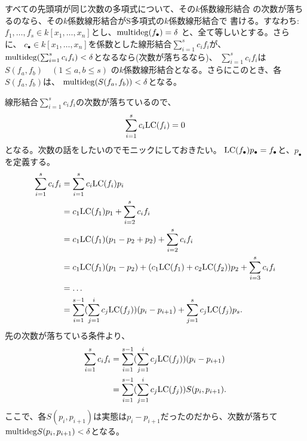 \documentclass[9pt]{ltjsarticle}
\begin{document}
すべての先頭項が同じ次数の多項式について、その$k$係数線形結合
の次数が落ちるのなら、その$k$係数線形結合がS多項式の$k$係数線形結合で
書ける。すなわち:
$f_1,\dots,f_s \in k[x_1,\dots,x_n]$とし、$\mathrm{multideg}(f_\bullet ) = \delta$
と、全て等しいとする。さらに、
$c_\bullet \in k[x_1,\dots,x_n]$を係数とした線形結合$\sum_{i=1}^s c_i f_i$が、
$\mathrm{multideg}(\sum_{i=1}^s c_i f_i) < \delta$となるなら(次数が落ちるなら)、
$\sum_{i=1}^s c_i f_i$は$S(f_a,f_b)\quad (1 \le a,b \le s)$
の$k$係数線形結合となる。さらにこのとき、各$S(f_a,f_b)$は、
$\mathrm{multideg}(S(f_a,f_b))<\delta$となる。
\begin{myproof}
  線形結合$\sum_{i=1}^s c_i f_i$の次数が落ちているので、
  \begin{align}
    \sum_{i=1}^s c_i {\rm LC}(f_i) = 0
  \end{align}
  となる。次数の話をしたいのでモニックにしておきたい。
  ${\rm LC}(f_\bullet)p_\bullet = f_\bullet$と、$p_\bullet$を定義する。
  \begin{align}
    \sum_{i=1}^s c_i f_i
    &=
    \sum_{i=1}^s c_i {\rm LC}(f_i)p_i\\
    &=
    c_1 {\rm LC}(f_1) p_1 + \sum_{i=2}^s c_i f_i \\
    &=
    c_1 {\rm LC}(f_1) (p_1 - p_2 + p_2) + \sum_{i=2}^s c_i f_i \\
    &=
    c_1 {\rm LC}(f_1) (p_1 - p_2)
    + (c_1 {\rm LC}(f_1) + c_2 {\rm LC}(f_2))p_2
    + \sum_{i=3}^s c_i f_i\\
    &=\dots\\
    &=
    \sum_{i=1}^{s-1} (\sum_{j=1}^i c_j {\rm LC}(f_j))(p_i - p_{i+1})
    + \sum_{j=1}^s c_j {\rm LC}(f_j)p_s.
  \end{align}
  先の次数が落ちている条件より、
  \begin{align}
    \sum_{i=1}^s c_i f_i
    &=
    \sum_{i=1}^{s-1}(\sum_{j=1}^i c_j {\rm LC}(f_j))(p_i - p_{i+1})\\
    &=
    \sum_{i=1}^{s-1}(\sum_{j=1}^i c_j {\rm LC}(f_j))S(p_i,p_{i+1}).
  \end{align}
ここで、各$S(p_i,p_{i+1})$は実態は$p_i-p_{i+1}$だったのだから、次数が落ちて
$\mathrm{multideg}{S(p_i,p_{i+1})}<\delta$となる。
\end{myproof}
\end{document}
